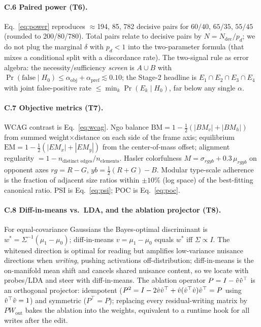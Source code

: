 \paragraph{C.6 Paired power (T6).} Eq.~\ref{eq:power} reproduces $\approx$194, 85, 782 decisive pairs
for $60/40$, $65/35$, $55/45$ (rounded to 200/80/780). Total pairs relate to decisive pairs by
$N=N_{\mathrm{dec}}/p_d$; we do not plug the marginal $\delta$ with $p_d{<}1$ into the two-parameter
formula (that mixes a conditional split with a discordance rate). The two-signal rule as error algebra:
the necessity/sufficiency \emph{screen} is $A\cup B$ with $\Pr(\text{false}\mid H_0)\le
\alpha_{\text{obj}}+\alpha_{\text{pref}}\lesssim0.10$; the Stage-2 headline is $E_1\cap E_2\cap E_3\cap
E_4$ with joint false-positive rate $\le\min_k\Pr(E_k\mid H_0)$, far below any single $\alpha$.

\paragraph{C.7 Objective metrics (T7).} WCAG contrast is Eq.~\ref{eq:wcag}. Ngo balance
$\mathrm{BM}=1-\tfrac12(|BM_v|+|BM_h|)$ from summed weight$\times$distance on each side of the frame
axis; equilibrium $\mathrm{EM}=1-\tfrac12(|EM_x|+|EM_y|)$ from the center-of-mass offset; alignment
regularity $=1-n_{\text{distinct edges}}/n_{\text{elements}}$. Hasler colorfulness
$M=\sigma_{rgyb}+0.3\,\mu_{rgyb}$ on opponent axes $rg{=}R-G$, $yb{=}\tfrac12(R+G)-B$. Modular type-scale
adherence is the fraction of adjacent size ratios within $\pm10\%$ (log space) of the best-fitting
canonical ratio. PSI is Eq.~\ref{eq:psi}; POC is Eq.~\ref{eq:poc}.

\paragraph{C.8 Diff-in-means vs.\ LDA, and the ablation projector (T8).} For equal-covariance Gaussians
the Bayes-optimal discriminant is $w^{*}=\Sigma^{-1}(\mu_1-\mu_0)$; diff-in-means $v=\mu_1-\mu_0$ equals
$w^{*}$ iff $\Sigma\propto I$. The whitened direction is optimal for reading but amplifies low-variance
nuisance directions when \emph{writing}, pushing activations off-distribution; diff-in-means is the
on-manifold mean shift and cancels shared nuisance content, so we locate with probes/LDA and steer with
diff-in-means. The ablation operator $P=I-\hat{v}\hat{v}^{\top}$ is an orthogonal projector: idempotent
($P^2=I-2\hat{v}\hat{v}^{\top}+\hat{v}(\hat{v}^{\top}\hat{v})\hat{v}^{\top}=P$ using $\hat{v}^{\top}\hat{v}=1$) and
symmetric ($P^{\top}=P$); replacing every residual-writing matrix by $PW_{\text{out}}$ bakes the
ablation into the weights, equivalent to a runtime hook for all writes after the edit.

